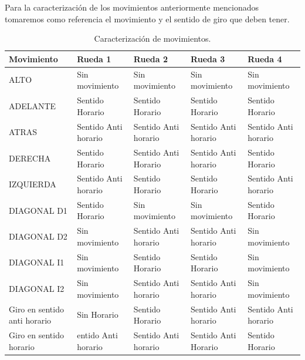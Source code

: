 \documentclass[12pt]{book} %
\begin{document}
Para la caracterización de los movimientos anteriormente mencionados tomaremos como referencia el movimiento y el sentido de giro que deben tener.\\
\begin{table}[t]
\begin{center}
\begin{tabular}{| p{4cm} | p{3cm} | p{3cm} | p{3cm}  | p{3cm} |} 
	
	\hline
	Movimiento & Rueda 1 & Rueda 2 & Rueda 3 & Rueda 4\\
	\hline
	ALTO & Sin movimiento & Sin movimiento & Sin movimiento & Sin movimiento\\
	\hline
	ADELANTE & Sentido Horario & Sentido Horario & Sentido Horario & Sentido Horario\\
	\hline
	ATRAS & Sentido Anti horario & Sentido Anti horario & Sentido Anti horario & Sentido Anti horario\\
	\hline
	DERECHA & Sentido Horario & Sentido Anti Horario & Sentido Anti horario & Sentido Horario\\
	\hline
	IZQUIERDA & Sentido Anti horario & Sentido Horario & Sentido Horario & Sentido Anti horario\\
	\hline
	DIAGONAL D1 & Sentido Horario & Sin movimiento & Sin movimiento & Sentido Horario\\
	\hline
	DIAGONAL D2 & Sin movimiento & Sentido Anti horario & Sentido Anti horario & Sin movimiento\\
	\hline
	DIAGONAL I1 & Sin movimiento & Sentido Horario & Sentido Horario & Sin movimiento\\
	\hline
	DIAGONAL I2 & Sin movimiento & Sentido Anti horario & Sentido Anti horario & Sin movimiento\\
	\hline
Giro en sentido anti horario & Sin Horario & Sentido Horario & Sentido Anti horario & Sentido Anti horario\\
	\hline
Giro en sentido horario & entido Anti horario & Sentido Anti horario & Sentido Anti Horario & Sentido Horario\\
	\hline
\end{tabular}
\caption{Caracterización de movimientos.}
\end{center}
\end{table}
\end{document}
